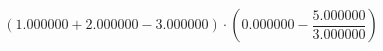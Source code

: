 \documentclass{article}
\begin{document}
$$(1.000000 + 2.000000 - 3.000000) \cdot (0.000000 - \frac{5.000000}{3.000000})$$
\end{document}

